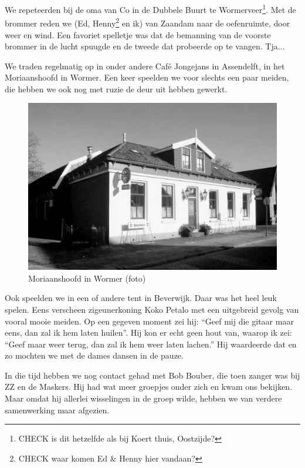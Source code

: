 \documentclass[10pt,twoside, openright]{memoir}
\begin{document}
We repeteerden bij de oma van Co in de Dubbele Buurt te Wormerveer\footnote{CHECK is dit hetzelfde als bij Koert thuis, Oostzijde?}. Met de brommer reden we (Ed, Henny\footnote{CHECK waar komen Ed & Henny hier vandaan?} en ik) van Zaandam naar de oefenruimte, door weer en wind. Een favoriet spelletje was dat de bemanning van de voorste brommer in de lucht spuugde en de tweede dat probeerde op te vangen. Tja...

We traden regelmatig op in onder andere Café Jongejans in Assendelft, in het Moriaanshoofd in Wormer. Een keer speelden we voor slechts een paar meiden, die hebben we ook nog met ruzie de deur uit hebben gewerkt. 

\begin{figure}
\includegraphics[width=\textwidth]{img/ch26/Moriaanshoofd}
\caption*{\footnotesize Moriaanshoofd in Wormer (foto)}
\end{figure}

Ook speelden we in een of andere tent in Beverwijk. Daar was het heel leuk spelen. Eens verscheen zigeunerkoning Koko Petalo met een uitgebreid gevolg van vooral mooie meiden. Op een gegeven moment zei hij: ``Geef mij die gitaar maar eens, dan zal ik hem laten huilen''. Hij kon er echt geen hout van, waarop ik zei: ``Geef maar weer terug, dan zal ik hem weer laten lachen.'' Hij waardeerde dat en zo mochten we met de dames dansen in de pauze.

In die tijd hebben we nog contact gehad met Bob Bouber, die toen zanger was bij ZZ en de Maskers. Hij had wat meer groepjes onder zich en kwam ons bekijken. Maar omdat hij allerlei wisselingen in de groep wilde, hebben we van verdere samenwerking maar afgezien. 
\end{document}
